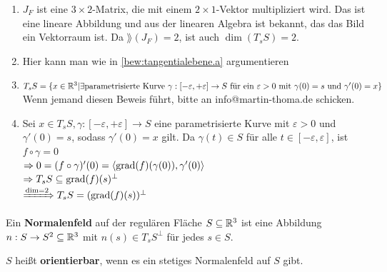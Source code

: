 \begin{beweis}\leavevmode
    \begin{enumerate}[label=\alph*)]
        \item \label{bew:tangentialebene.a} $J_F$ ist eine $3 \times 2$-Matrix, die mit einem $2 \times 1$-Vektor
              multipliziert wird. Das ist eine lineare Abbildung und aus der
              linearen Algebra ist bekannt, das das Bild ein Vektorraum ist.
              Da $\rang(J_F) = 2$, ist auch $\dim (T_s S) = 2$.
        \item Hier kann man wie in \cref{bew:tangentialebene.a} argumentieren
        \item $T_s S = \{x \in \mathbb{R}^3 | \exists \text{parametrisierte Kurve }
          \gamma:[- \varepsilon, + \varepsilon] \rightarrow S
          \text{ für ein } \varepsilon > 0
          \text{ mit } \gamma(0) = s \text{ und } \gamma'(0) = x
          \}$\\
          Wenn jemand diesen Beweis führt, bitte an info@martin-thoma.de
          schicken.%
        \item Sei $x \in T_s S, \gamma:[-\varepsilon, +\varepsilon] \rightarrow S$
    eine parametrisierte Kurve mit $\varepsilon > 0$ und $\gamma'(0) = s$,
    sodass $\gamma'(0) = x$ gilt. Da $\gamma(t) \in S$ für alle
    $t \in [-\varepsilon, \varepsilon]$, ist $f \circ \gamma = 0$\\
    $\Rightarrow 0 = (f \circ \gamma)'(0) = \langle \operatorname{grad}(f)(\gamma(0)), \gamma'(0) \rangle$\\
    $\Rightarrow T_s S \subseteq \operatorname{grad} (f)(s)^\perp$\\
    $\xRightarrow{\dim = 2} T_s S = (\operatorname{grad}(f)(s))^\perp$
    \end{enumerate}
\end{beweis}

\begin{definition}%
    \begin{defenum}
        \item Ein \textbf{Normalenfeld} auf der regulären
              Fläche $S \subseteq \mathbb{R}^3$ ist eine Abbildung $n: S \rightarrow S^2 \subseteq \mathbb{R}^3$
              mit $n(s) \in T_s S^\perp$ für jedes $s \in S$.
        \item $S$ heißt \textbf{orientierbar},
              wenn es ein stetiges Normalenfeld auf $S$ gibt.
    \end{defenum}
\end{definition}

